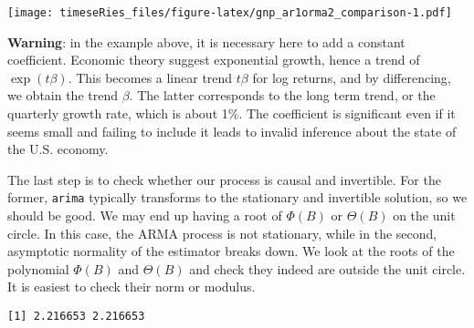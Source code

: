 \documentclass[]{book}
\newenvironment{Shaded}{\begin{snugshade}}{\end{snugshade}}
\newcommand{\CommentTok}[1]{\textcolor[rgb]{0.56,0.35,0.01}{\textit{#1}}}
\newcommand{\DecValTok}[1]{\textcolor[rgb]{0.00,0.00,0.81}{#1}}
\newcommand{\KeywordTok}[1]{\textcolor[rgb]{0.13,0.29,0.53}{\textbf{#1}}}
\newcommand{\NormalTok}[1]{#1}
\newcommand{\OperatorTok}[1]{\textcolor[rgb]{0.81,0.36,0.00}{\textbf{#1}}}
\begin{document}
\texttt{[image: timeseRies\_files/figure-latex/gnp\_ar1orma2\_comparison-1.pdf]}

\textbf{Warning}: in the example above, it is necessary here to add a
constant coefficient. Economic theory suggest exponential growth, hence
a trend of \(\exp(t \beta)\). This becomes a linear trend \(t\beta\) for
log returns, and by differencing, we obtain the trend \(\beta\). The
latter corresponds to the long term trend, or the quarterly growth rate,
which is about 1\%. The coefficient is significant even if it seems
small and failing to include it leads to invalid inference about the
state of the U.S. economy.

The last step is to check whether our process is causal and invertible.
For the former, \texttt{arima} typically transforms to the stationary
and invertible solution, so we should be good. We may end up having a
root of \(\Phi(B)\) or \(\Theta(B)\) on the unit circle. In this case,
the ARMA process is not stationary, while in the second, asymptotic
normality of the estimator breaks down. We look at the roots of the
polynomial \(\Phi(B)\) and \(\Theta(B)\) and check they indeed are
outside the unit circle. It is easiest to check their norm or modulus.

\begin{Shaded}
\end{Shaded}

\begin{verbatim}
[1] 2.216653 2.216653
\end{verbatim}

\begin{Shaded}
\end{Shaded}
\end{document}
